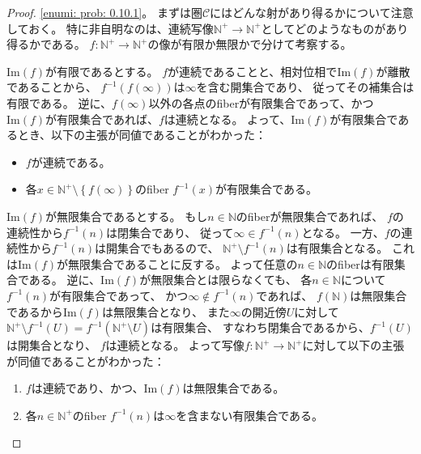 \documentclass[uplatex]{jsarticle}
\theoremstyle{definition}
\newcommand{\im}{\mathrm{Im}}
\def\N{\mathbb{N}}
\def\mcC{\mathcal{C}}
\begin{document}
\begin{proof}
  \ref{enumi: prob: 0.10.1}。
  まずは圏\(\mcC\)にはどんな射があり得るかについて注意しておく。
  特に非自明なのは、連続写像\(\N^+\to \N^+\)としてどのようなものがあり得るかである。
  \(f:\N^+\to \N^+\)の像が有限か無限かで分けて考察する。

  \(\im(f)\)が有限であるとする。
  \(f\)が連続であることと、相対位相で\(\im(f)\)が離散であることから、
  \(f^{-1}(f(\infty))\)は\(\infty\)を含む開集合であり、
  従ってその補集合は有限である。
  逆に、\(f(\infty)\)以外の各点のfiberが有限集合であって、かつ
  \(\im(f)\)が有限集合であれば、\(f\)は連続となる。
  よって、\(\im(f)\)が有限集合であるとき、以下の主張が同値であることがわかった：
  \begin{itemize}
    \item
    \(f\)が連続である。
    \item
    各\(x\in \N^+\setminus \left\{ f(\infty)\right\}\)のfiber
    \(f^{-1}(x)\)が有限集合である。
  \end{itemize}

  \(\im(f)\)が無限集合であるとする。
  もし\(n\in \N\)のfiberが無限集合であれば、
  \(f\)の連続性から\(f^{-1}(n)\)は閉集合であり、
  従って\(\infty\in f^{-1}(n)\)となる。
  一方、\(f\)の連続性から\(f^{-1}(n)\)は開集合でもあるので、
  \(\N^+\setminus f^{-1}(n)\)は有限集合となる。
  これは\(\im(f)\)が無限集合であることに反する。
  よって任意の\(n\in \N\)のfiberは有限集合である。
  逆に、\(\im(f)\)が無限集合とは限らなくても、
  各\(n\in \N\)について\(f^{-1}(n)\)が有限集合であって、
  かつ\(\infty\not\in f^{-1}(n)\)であれば、
  \(f(\N)\)は無限集合であるから\(\im(f)\)は無限集合となり、
  また\(\infty\)の開近傍\(U\)に対して
  \(\N^+ \setminus f^{-1}(U) = f^{-1}(\N^+\setminus U)\)は有限集合、
  すなわち閉集合であるから、\(f^{-1}(U)\)は開集合となり、
  \(f\)は連続となる。
  よって写像\(f:\N^+\to \N^+\)に対して以下の主張が同値であることがわかった：
  \begin{enumerate}[label=(\Alph*)]
    \item \label{enumi: proof: prob: 0.10.1.1}
    \(f\)は連続であり、かつ、\(\im (f)\)は無限集合である。
    \item \label{enumi: proof: prob: 0.10.1.2}
    各\(n\in \N^+\)のfiber \(f^{-1}(n)\)は\(\infty\)を含まない有限集合である。
  \end{enumerate}


\end{proof}
\end{document}
